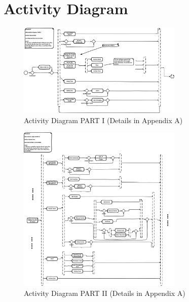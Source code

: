 \documentclass[12pt,a4paper]{report}
\begin{document}
\section{Activity Diagram}
\begin{figure}[H]
	\centering
	\includegraphics[width=0.7\textwidth]{./pics/ActivatyDiagramPARTI.png}
	\caption{Activity Diagram PART I (Details in Appendix A)}
\end{figure}
\begin{figure}[H]
	\centering
	\includegraphics[width=0.7\textwidth]{./pics/ActivatyDiagramPARTII.png}
	\caption{Activity Diagram PART II (Details in Appendix A)}
\end{figure}
\end{document}
